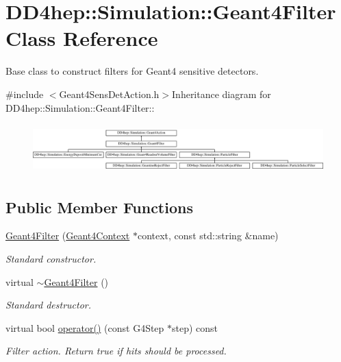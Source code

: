 \hypertarget{class_d_d4hep_1_1_simulation_1_1_geant4_filter}{
\section{DD4hep::Simulation::Geant4Filter Class Reference}
\label{class_d_d4hep_1_1_simulation_1_1_geant4_filter}
}


Base class to construct filters for Geant4 sensitive detectors.  


{\ttfamily \#include $<$Geant4SensDetAction.h$>$}Inheritance diagram for DD4hep::Simulation::Geant4Filter::\begin{figure}[H]
\begin{center}
\leavevmode
\includegraphics[height=1.91781cm]{class_d_d4hep_1_1_simulation_1_1_geant4_filter}
\end{center}
\end{figure}
\subsection*{Public Member Functions}
\begin{DoxyCompactItemize}
\item 
\hyperlink{class_d_d4hep_1_1_simulation_1_1_geant4_filter_a9473fedf4d296dd044a9310a9da57bb4}{Geant4Filter} (\hyperlink{class_d_d4hep_1_1_simulation_1_1_geant4_context}{Geant4Context} $\ast$context, const std::string \&name)
\begin{DoxyCompactList}\small\item\em Standard constructor. \item\end{DoxyCompactList}\item 
virtual \hyperlink{class_d_d4hep_1_1_simulation_1_1_geant4_filter_a2fdb09d7018165b25034b37fa8eb9930}{$\sim$Geant4Filter} ()
\begin{DoxyCompactList}\small\item\em Standard destructor. \item\end{DoxyCompactList}\item 
virtual bool \hyperlink{class_d_d4hep_1_1_simulation_1_1_geant4_filter_afff6fafea1b7c0c7d61834ae0a51a23f}{operator()} (const G4Step $\ast$step) const 
\begin{DoxyCompactList}\small\item\em Filter action. Return true if hits should be processed. \item\end{DoxyCompactList}\end{DoxyCompactItemize}


